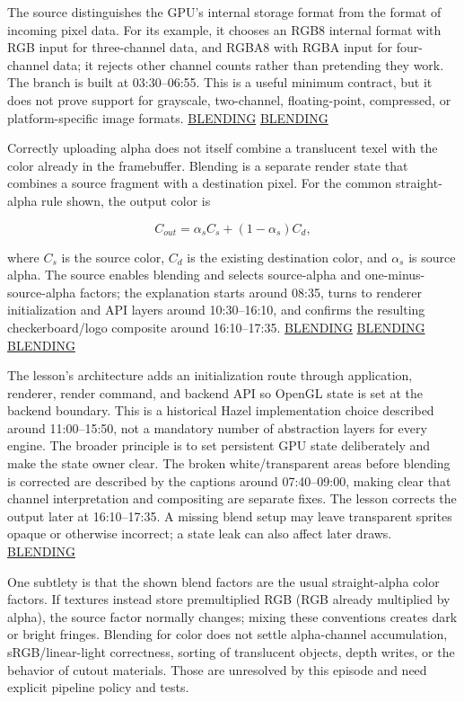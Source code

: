 The source distinguishes the GPU's internal storage format from the format of incoming pixel data. For its example, it chooses an RGB8 internal format with RGB input for three-channel data, and RGBA8 with RGBA input for four-channel data; it rejects other channel counts rather than pretending they work. The branch is built at 03:30--06:55. This is a useful minimum contract, but it does not prove support for grayscale, two-channel, floating-point, compressed, or platform-specific image formats. \href{https://www.youtube.com/watch?v=N94fHNZEHas&t=210s}{BLENDING} \href{https://www.youtube.com/watch?v=N94fHNZEHas&t=390s}{BLENDING}

Correctly uploading alpha does not itself combine a translucent texel with the color already in the framebuffer. Blending is a separate render state that combines a source fragment with a destination pixel. For the common straight-alpha rule shown, the output color is

\[C_{out}=\alpha_s C_s+(1-\alpha_s)C_d,\]

where \(C_s\) is the source color, \(C_d\) is the existing destination color, and \(\alpha_s\) is source alpha. The source enables blending and selects source-alpha and one-minus-source-alpha factors; the explanation starts around 08:35, turns to renderer initialization and API layers around 10:30--16:10, and confirms the resulting checkerboard/logo composite around 16:10--17:35. \href{https://www.youtube.com/watch?v=N94fHNZEHas&t=515s}{BLENDING} \href{https://www.youtube.com/watch?v=N94fHNZEHas&t=630s}{BLENDING} \href{https://www.youtube.com/watch?v=N94fHNZEHas&t=970s}{BLENDING}

The lesson's architecture adds an initialization route through application, renderer, render command, and backend API so OpenGL state is set at the backend boundary. This is a historical Hazel implementation choice described around 11:00--15:50, not a mandatory number of abstraction layers for every engine. The broader principle is to set persistent GPU state deliberately and make the state owner clear. The broken white/transparent areas before blending is corrected are described by the captions around 07:40--09:00, making clear that channel interpretation and compositing are separate fixes. The lesson corrects the output later at 16:10--17:35. A missing blend setup may leave transparent sprites opaque or otherwise incorrect; a state leak can also affect later draws. \href{https://www.youtube.com/watch?v=N94fHNZEHas&t=460s}{BLENDING}

One subtlety is that the shown blend factors are the usual straight-alpha color factors. If textures instead store premultiplied RGB (RGB already multiplied by alpha), the source factor normally changes; mixing these conventions creates dark or bright fringes. Blending for color does not settle alpha-channel accumulation, sRGB/linear-light correctness, sorting of translucent objects, depth writes, or the behavior of cutout materials. Those are unresolved by this episode and need explicit pipeline policy and tests.

